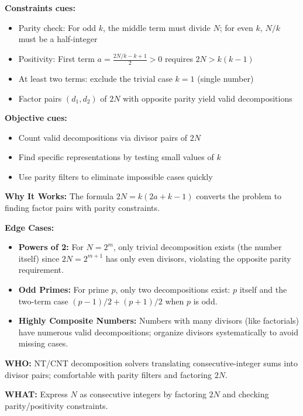 \documentclass[12pt]{article}
\begin{document}
\textbf{Constraints cues:}
\begin{itemize}
    \item Parity check: For odd $k$, the middle term must divide $N$; for even $k$, $N/k$ must be a half-integer
    \item Positivity: First term $a = \frac{2N/k - k + 1}{2} > 0$ requires $2N > k(k-1)$
    \item At least two terms: exclude the trivial case $k=1$ (single number)
    \item Factor pairs $(d_1, d_2)$ of $2N$ with opposite parity yield valid decompositions
\end{itemize}

\textbf{Objective cues:}
\begin{itemize}
    \item Count valid decompositions via divisor pairs of $2N$
    \item Find specific representations by testing small values of $k$
    \item Use parity filters to eliminate impossible cases quickly
\end{itemize}

\textbf{Why It Works:} The formula $2N = k(2a + k - 1)$ converts the problem to finding factor pairs with parity constraints.

\textbf{Edge Cases:}
\begin{itemize}
    \item \textbf{Powers of 2:} For $N = 2^m$, only trivial decomposition exists (the number itself) since $2N = 2^{m+1}$ has only even divisors, violating the opposite parity requirement.
    \item \textbf{Odd Primes:} For prime $p$, only two decompositions exist: $p$ itself and the two-term case $(p-1)/2 + (p+1)/2$ when $p$ is odd.
    \item \textbf{Highly Composite Numbers:} Numbers with many divisors (like factorials) have numerous valid decompositions; organize divisors systematically to avoid missing cases.
\end{itemize}

\textbf{WHO:} NT/CNT decomposition solvers translating consecutive-integer sums into divisor pairs; comfortable with parity filters and factoring $2N$.

\textbf{WHAT:} Express $N$ as consecutive integers by factoring $2N$ and checking parity/positivity constraints.
\end{document}
